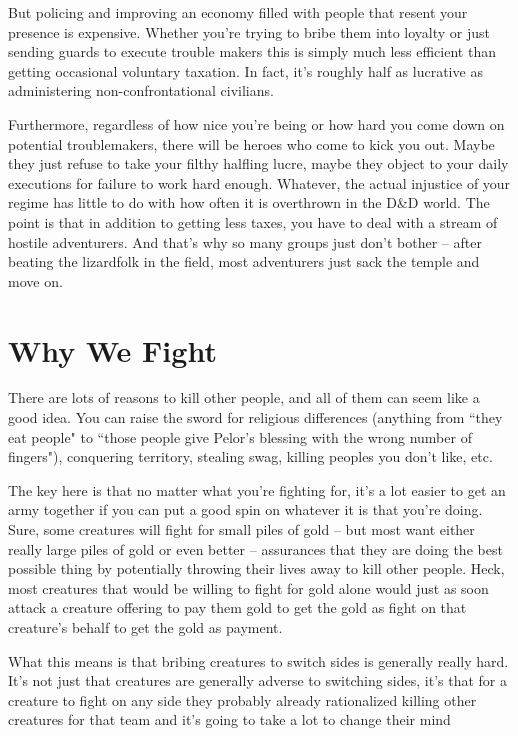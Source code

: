 But policing and improving an economy filled with people that resent your presence is expensive. Whether you're trying to bribe them into loyalty or just sending guards to execute trouble makers this is simply much less efficient than getting occasional voluntary taxation. In fact, it's roughly half as lucrative as administering non-confrontational civilians.

Furthermore, regardless of how nice you're being or how hard you come down on potential troublemakers, there will be heroes who come to kick you out. Maybe they just refuse to take your filthy halfling lucre, maybe they object to your daily executions for failure to work hard enough. Whatever, the actual injustice of your regime has little to do with how often it is overthrown in the D\&D world. The point is that in addition to getting less taxes, you have to deal with a stream of hostile adventurers. And that's why so many groups just don't bother -- after beating the lizardfolk in the field, most adventurers just sack the temple and move on.

\section{Why We Fight}
\vspace*{-8pt}

There are lots of reasons to kill other people, and all of them can seem like a good idea. You can raise the sword for religious differences (anything from ``they eat people" to ``those people give Pelor's blessing with the wrong number of fingers"), conquering territory, stealing swag, killing peoples you don't like, etc.

The key here is that no matter what you're fighting for, it's a lot easier to get an army together if you can put a good spin on whatever it is that you're doing. Sure, some creatures will fight for small piles of gold -- but most want either really large piles of gold or even better -- assurances that they are doing the best possible thing by potentially throwing their lives away to kill other people. Heck, most creatures that would be willing to fight for gold alone would just as soon attack a creature offering to pay them gold to get the gold as fight on that creature's behalf to get the gold as payment.

What this means is that bribing creatures to switch sides is generally really hard. It's not just that creatures are generally adverse to switching sides, it's that for a creature to fight on any side they probably already rationalized killing other creatures for that team and it's going to take a lot to change their mind
